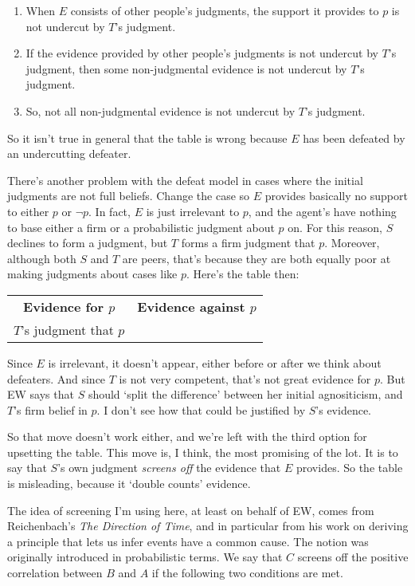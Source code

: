 \begin{enumerate}
\item When $E$ consists of other people's judgments, the support it provides to $p$ is not undercut by $T$'s judgment.
\item If the evidence provided by other people's judgments is not undercut by $T$'s judgment, then some non-judgmental evidence is not undercut by $T$'s judgment.
\item So, not all non-judgmental evidence is not undercut by $T$'s judgment.
\end{enumerate}

\noindent So it isn't true in general that the table is wrong because $E$ has been defeated by an undercutting defeater.

There's another problem with the defeat model in cases where the initial judgments are not full beliefs. Change the case so $E$ provides basically no support to either $p$ or $\neg p$. In fact, $E$ is just irrelevant to $p$, and the agent's have nothing to base either a firm or a probabilistic judgment about $p$ on. For this reason, $S$ declines to form a judgment, but $T$ forms a firm judgment that $p$. Moreover, although both $S$ and $T$ are peers, that's because they are both equally poor at making judgments about cases like $p$. Here's the table then:

\begin{center}
\begin{tabular}{c c}
\textbf{Evidence for $p$} & \textbf{Evidence against $p$} \\
$T$'s judgment that $p$ & \\
\end{tabular}
\end{center}

\noindent Since $E$ is irrelevant, it doesn't appear, either before or after we think about defeaters. And since $T$ is not very competent, that's not great evidence for $p$. But EW says that $S$ should `split the difference' between her initial agnositicism, and $T$'s firm belief in $p$. I don't see how that could be justified by $S$'s evidence.

So that move doesn't work either, and we're left with the third option for upsetting the table. This move is, I think, the most promising of the lot. It is to say that $S$'s own judgment \textit{screens off} the evidence that $E$ provides. So the table is misleading, because it `double counts' evidence.

The idea of screening I'm using here, at least on behalf of EW, comes from Reichenbach's \textit{The Direction of Time}, \nocite{Reichenbach1956} and in particular from his work on deriving a principle that lets us infer events have a common cause. The notion was originally introduced in probabilistic terms. We say that \(C\) screens off the positive correlation between \(B\) and \(A\) if the following two conditions are met.

